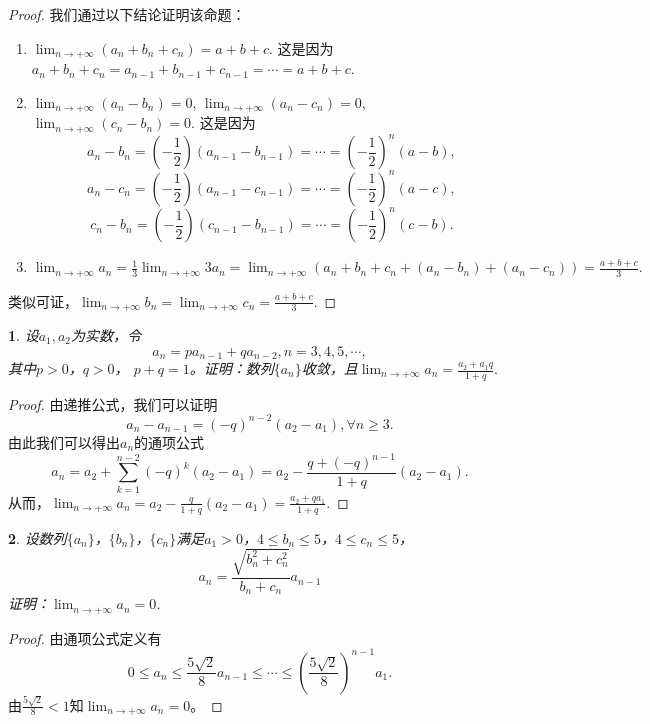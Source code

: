\documentclass[utf8]{book}
\newtheorem{example}{}[section]             %
\begin{document}
\begin{proof}
我们通过以下结论证明该命题：
\begin{enumerate}
\renewcommand\labelenumi{\normalfont(\theenumi)}
\item $\displaystyle \lim_{n\to +\infty}(a_n + b_n + c_n) = a+b+c$. 这是因为$a_n + b_n + c_n = a_{n-1}+b_{n-1}+c_{n-1} = \cdots = a+b+c$.
\item $\displaystyle \lim_{n\to +\infty}(a_n -b_n) = 0$, $\displaystyle \lim_{n\to +\infty}(a_n -c_n) = 0$, $\displaystyle \lim_{n\to +\infty}(c_n -b_n) = 0$.
这是因为$$a_n - b_n = \left(-\frac{1}{2}\right)(a_{n-1}-b_{n-1}) = \cdots = \left(-\frac{1}{2}\right)^n(a-b),$$
$$a_n - c_n = \left(-\frac{1}{2}\right)(a_{n-1}-c_{n-1}) = \cdots = \left(-\frac{1}{2}\right)^n(a-c),$$
$$c_n - b_n = \left(-\frac{1}{2}\right)(c_{n-1}-b_{n-1}) = \cdots = \left(-\frac{1}{2}\right)^n(c-b).$$
\item $\displaystyle \lim_{n\to +\infty}a_n =\frac{1}{3}\displaystyle \lim_{n\to +\infty}3a_n = \lim_{n\to +\infty}(a_n+b_n+c_n +(a_n-b_n) + (a_n-c_n))=\frac{a+b+c}{3}.$
\end{enumerate}

类似可证，$\displaystyle \lim_{n\to +\infty}b_n=\lim_{n\to +\infty}c_n = \frac{a+b+c}{3}$.
\end{proof}
\begin{example}
设$a_1,a_2$为实数，令$$a_n = pa_{n-1} + qa_{n-2}, n = 3,4,5,\cdots,$$
其中$p>0$，$q>0$， $p+q = 1$。证明：数列$\{a_n\}$收敛，且$\displaystyle \lim_{n\to +\infty}a_n=\frac{a_2+a_1q}{1+q}.$
\end{example}
\begin{proof}
由递推公式，我们可以证明$$a_n-a_{n-1} =\left(-q\right)^{n-2}(a_2 - a_1), \forall n \geq 3.$$
由此我们可以得出$a_n$的通项公式
$$a_n = a_2 + \displaystyle \sum_{k=1}^{n-2}\left(-q\right)^k(a_2 - a_1) = a_2 - \frac{q+(-q)^{n-1}}{1+q}(a_2-a_1).$$
从而，$\displaystyle \lim_{n\to +\infty}a_n = a_2 - \frac{q}{1+q}(a_2-a_1) = \frac{a_2+qa_1}{1+q}$.
\end{proof}
\begin{example}
设数列$\{a_n\}$，$\{b_n\}$，$\{c_n\}$满足$a_1 > 0$，$4 \leq b_n \leq 5$，$4 \leq c_n \leq 5$，$$\displaystyle a_n=\frac{\sqrt{b_n^2+c_n^2}}{b_n+c_n}a_{n-1}$$
证明：$\displaystyle \lim_{n\to +\infty}a_n=0$.
\end{example}
\begin{proof}
由通项公式定义有$$0\leq a_n \leq \frac{5\sqrt 2}{8}a_{n-1} \leq \cdots \leq \left(\frac{5\sqrt 2}{8}\right)^{n-1}a_1.$$
由$\displaystyle\frac{5\sqrt 2}{8} < 1$知$\displaystyle \lim_{n\to +\infty}a_n=0$。
\end{proof}
\end{document}
